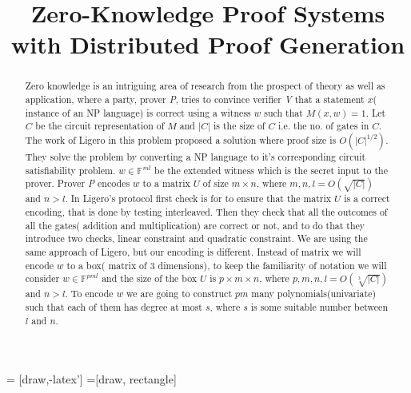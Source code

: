 \documentclass{article}
\title{Zero-Knowledge Proof Systems with Distributed Proof Generation}
\newcommand{\mycomment}[1] {\textcolor{blue}  {{\sl{#1}}}}
\begin{document}
 = [draw,-latex']
=[draw, rectangle]
\maketitle
\begin{abstract}

Zero knowledge is an intriguing area of research from the prospect of theory as well as application, where a party, prover \textit{P}, tries to convince verifier \textit{V} that a statement $x$( instance of an NP language) is correct using a witness $w$ such that $M(x,w)=1$. Let $C$ be the circuit representation of $M$ and $|C|$ is the size of $C$ i.e. the no. of gates in $C$. The work of Ligero in this problem proposed a solution where proof size is $O(|C|^{1/2})$. They solve the problem by converting a NP language to it's corresponding circuit satisfiability problem. $w\in \mathbb{F}^{ml}$ be the extended witness which is the secret input to the prover. Prover \textit{P} encodes $w$ to a matrix $U$ of size $m\times n$, where $m, n, l = O(\sqrt{|C|})$ and $n>l$. In Ligero's protocol first check is for to ensure that the matrix $U$ is a correct encoding, that is done by testing interleaved. Then they check that all the outcomes of all the gates( addition and multiplication) are correct or not, and to do that they introduce two checks, linear constraint and quadratic constraint. We are using the same approach of Ligero, but our encoding is different. Instead of matrix we will encode $w$ to a box( matrix of 3 dimensions), to keep the familiarity of notation we will consider $w\in \mathbb{F}^{pml}$ and the size of the box $U$ is $p\times m\times n$, where $p, m, n, l = O(\sqrt[3]{|C|})$ and $n>l$. To encode $w$ we are going to construct $pm$ many polynomials(univariate) such that each of them has degree at most $s$, where $s$ is some suitable number between $l$ and $n$. 
\\

\end{abstract}
\end{document}
